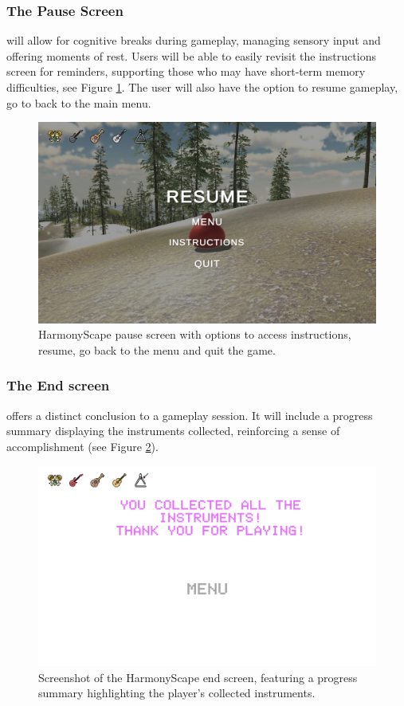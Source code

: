 \documentclass{l4proj}
\begin{document}

\subsubsection{The Pause Screen} will allow for cognitive breaks during gameplay, managing sensory input and offering moments of rest. Users will be able to easily revisit the instructions screen for reminders, supporting those who may have short-term memory difficulties, see Figure \ref{fig:pause_screen}. The user will also have the option to resume gameplay, go to back to the main menu.

\begin{figure}[h]
 \centering
 \includegraphics[width=0.7\linewidth]{dissertation/images/pause_screen.png} 
 \caption{HarmonyScape pause screen with options to access instructions, resume, go back to the menu and quit the game.}
 \label{fig:pause_screen} 
\end{figure}

\subsubsection{The End screen} offers a distinct conclusion to a gameplay session. It will include a progress summary displaying the instruments collected, reinforcing a sense of accomplishment (see Figure \ref{fig:end_screen}).

\begin{figure}[h]
 \centering
 \includegraphics[width=0.7\linewidth]{dissertation/images/end_screen.png} 
 \caption{Screenshot of the HarmonyScape end screen, featuring a progress summary highlighting the player's collected instruments.}
 \label{fig:end_screen} 
\end{figure}
\end{document}
